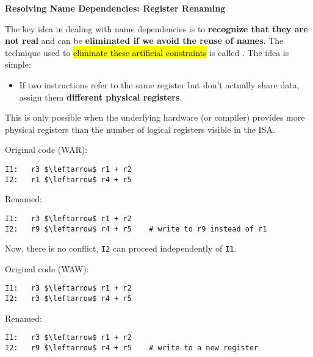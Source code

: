 \highspace
\begin{flushleft}
    \textcolor{Green3}{ \textbf{Resolving Name Dependencies: Register Renaming}}
    \label{def: Register Renaming}
\end{flushleft}
The key idea in dealing with name dependencies is to \textbf{recognize that they are not real} and can be \textbf{eliminated if we avoid the reuse of names}. The technique used to \hl{eliminate these artificial constraints} is called . The idea is simple:
\begin{itemize}
    \item If two instructions refer to the same register but don't actually share data, assign them \textbf{different physical registers}.
\end{itemize}
This is only possible when the underlying hardware (or compiler) provides more physical registers than the number of logical registers visible in the ISA.

\highspace
\begin{examplebox}
    Original code (WAR):
    \begin{lstlisting}[language=riscv, mathescape=true]
I1:   r3 $\leftarrow$ r1 + r2
I2:   r1 $\leftarrow$ r4 + r5\end{lstlisting}
    Renamed:
    \begin{lstlisting}[language=riscv, mathescape=true]
I1:   r3 $\leftarrow$ r1 + r2
I2:   r9 $\leftarrow$ r4 + r5    # write to r9 instead of r1\end{lstlisting}
    Now, there is no conflict, \texttt{I2} can proceed independently of \texttt{I1}.

    Original code (WAW):
    \begin{lstlisting}[language=riscv, mathescape=true]
I1:   r3 $\leftarrow$ r1 + r2
I2:   r3 $\leftarrow$ r4 + r5\end{lstlisting}
    Renamed:
    \begin{lstlisting}[language=riscv, mathescape=true]
I1:   r3 $\leftarrow$ r1 + r2
I2:   r9 $\leftarrow$ r4 + r5    # write to a new register\end{lstlisting}
\end{examplebox}

\newpage

